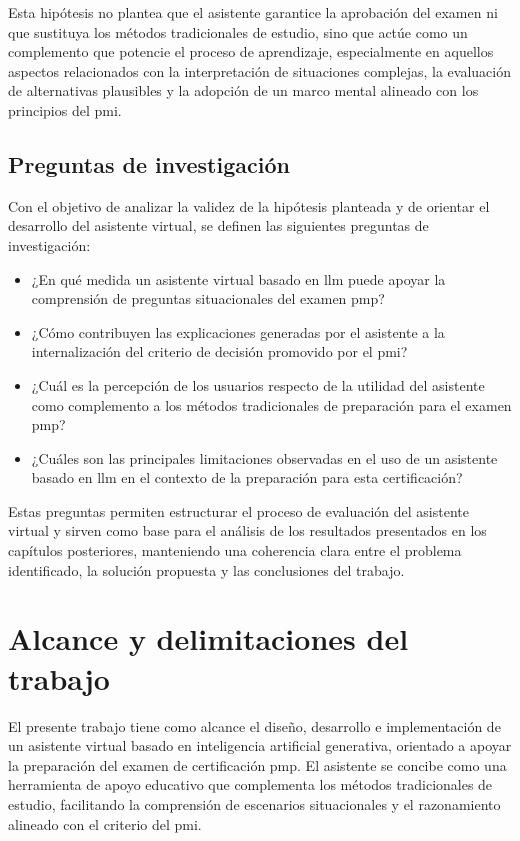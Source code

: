Esta hipótesis no plantea que el asistente garantice la aprobación del examen ni que sustituya los métodos tradicionales de estudio, sino que actúe como un complemento que potencie el proceso de aprendizaje, especialmente en aquellos aspectos relacionados con la interpretación de situaciones complejas, la evaluación de alternativas plausibles y la adopción de un marco mental alineado con los principios del \gls{pmi}.

\subsection{Preguntas de investigación}

Con el objetivo de analizar la validez de la hipótesis planteada y de orientar el desarrollo del asistente virtual, se definen las siguientes preguntas de investigación:

\begin{itemize}
  \item ¿En qué medida un asistente virtual basado en \gls{llm} puede apoyar la comprensión de preguntas situacionales del examen \gls{pmp}?
  \item ¿Cómo contribuyen las explicaciones generadas por el asistente a la internalización del criterio de decisión promovido por el \gls{pmi}?
  \item ¿Cuál es la percepción de los usuarios respecto de la utilidad del asistente como complemento a los métodos tradicionales de preparación para el examen \gls{pmp}?
  \item ¿Cuáles son las principales limitaciones observadas en el uso de un asistente basado en \gls{llm} en el contexto de la preparación para esta certificación?
\end{itemize}

Estas preguntas permiten estructurar el proceso de evaluación del asistente virtual y sirven como base para el análisis de los resultados presentados en los capítulos posteriores, manteniendo una coherencia clara entre el problema identificado, la solución propuesta y las conclusiones del trabajo.

\section{Alcance y delimitaciones del trabajo}

El presente trabajo tiene como alcance el diseño, desarrollo e implementación de un asistente virtual basado en inteligencia artificial generativa, orientado a apoyar la preparación del examen de certificación \gls{pmp}. El asistente se concibe como una herramienta de apoyo educativo que complementa los métodos tradicionales de estudio, facilitando la comprensión de escenarios situacionales y el razonamiento alineado con el criterio del \gls{pmi}.

